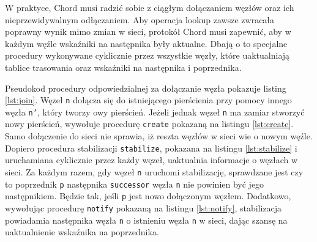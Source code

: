 \documentclass[12pt, twoside, openany]{report}
\begin{document}
W praktyce, Chord musi radzić sobie z ciągłym dołączaniem węzłów oraz ich nieprzewidywalnym odłączaniem. Aby operacja lookup zawsze zwracała poprawny wynik mimo zmian w sieci, protokół Chord musi zapewnić, aby w każdym węźle wskaźniki na następnika były aktualne. Dbają o to specjalne procedury wykonywane cyklicznie przez wszystkie węzły, które uaktualniają tablice trasowania oraz wskaźniki na następnika i poprzednika. 

Pseudokod procedury odpowiedzialnej za dołączanie węzła pokazuje listing \ref{lst:join}. Węzeł \texttt{n} dołącza się do istniejącego pierścienia przy pomocy innego węzła \texttt{n'}, który tworzy owy pierścień. Jeżeli jednak węzeł \texttt{n} ma zamiar stworzyć nowy pierścień, wywołuje procedurę \texttt{create} pokazaną na listingu \ref{lst:create}. Samo dołączenie do sieci nie sprawia, iż reszta węzłów w sieci wie o nowym węźle. Dopiero procedura stabilizacji \texttt{stabilize}, pokazana na listingu \ref{lst:stabilize} i uruchamiana cyklicznie przez każdy węzeł, uaktualnia informacje o węzłach w sieci. Za każdym razem, gdy węzeł \texttt{n} uruchomi stabilizację, sprawdzane jest czy to poprzednik \texttt{p} następnika \texttt{successor} węzła \texttt{n} nie powinien być jego następnikiem. Będzie tak, jeśli \texttt{p} jest nowo dołączonym węzłem. Dodatkowo, wywołując procedurę \texttt{notify} pokazaną na listingu \ref{lst:notify}, stabilizacja powiadamia następnika węzła \texttt{n} o istnieniu węzła \texttt{n} w sieci, dając szansę na uaktualnienie wskaźnika na poprzednika.











\end{document}
